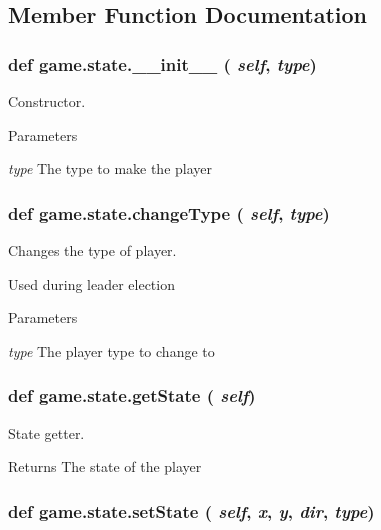 \subsection{Member Function Documentation}
\hypertarget{classgame_1_1state_aab1e3d8ecaf95966b3f0a6f818154f31}{
\subsubsection[{\_\-\_\-init\_\-\_\-}]{\setlength{\rightskip}{0pt plus 5cm}def game.state.\_\-\_\-init\_\-\_\- ( {\em self}, \/   {\em type})}}
\label{classgame_1_1state_aab1e3d8ecaf95966b3f0a6f818154f31}


Constructor. 


\begin{DoxyParams}{Parameters}
\item[{\em type}]The type to make the player \end{DoxyParams}
\hypertarget{classgame_1_1state_ae280c587f361655d8b8a64645dd46e3e}{
\subsubsection[{changeType}]{\setlength{\rightskip}{0pt plus 5cm}def game.state.changeType ( {\em self}, \/   {\em type})}}
\label{classgame_1_1state_ae280c587f361655d8b8a64645dd46e3e}


Changes the type of player. 

Used during leader election 
\begin{DoxyParams}{Parameters}
\item[{\em type}]The player type to change to \end{DoxyParams}
\hypertarget{classgame_1_1state_a568cdba2815170a28cf7ec2547997e64}{
\subsubsection[{getState}]{\setlength{\rightskip}{0pt plus 5cm}def game.state.getState ( {\em self})}}
\label{classgame_1_1state_a568cdba2815170a28cf7ec2547997e64}


State getter. 

\begin{DoxyReturn}{Returns}
The state of the player 
\end{DoxyReturn}
\hypertarget{classgame_1_1state_a15a24438cb708f1458d8688f878318be}{
\subsubsection[{setState}]{\setlength{\rightskip}{0pt plus 5cm}def game.state.setState ( {\em self}, \/   {\em x}, \/   {\em y}, \/   {\em dir}, \/   {\em type})}}
\label{classgame_1_1state_a15a24438cb708f1458d8688f878318be}


